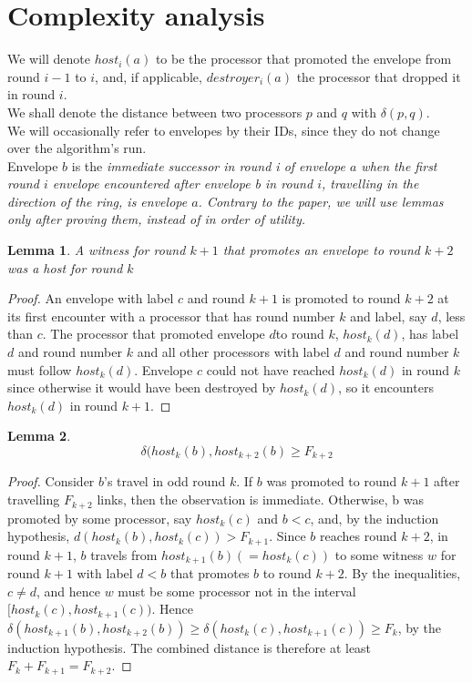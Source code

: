 \documentclass{article}
\newtheorem{lemma}{Lemma}
\begin{document}
\section{Complexity analysis}
We will denote $host_i(a)$ to be the processor that promoted the envelope from round $i-1$ to $i$, and, if applicable, $destroyer_i(a)$ the processor that dropped it in round $i$.
\\
We shall denote the distance between two processors $p$ and $q$ with $\delta(p, q)$.
\\
We will occasionally refer to envelopes by their IDs, since they do not change over the algorithm's run.
\\
Envelope $b$ is the \it{immediate successor in round i} of envelope $a$ when the first round $i$ envelope encountered after envelope b in round $i$, travelling in the direction of the ring, is envelope $a$.
Contrary to the paper, we will use lemmas only after proving them, instead of in order of utility.
\\
\begin{lemma}\label{p1}
    A witness for round $k+1$ that promotes an envelope to round $k+2$ was a host for round $k$
\end{lemma}
\begin{proof}
    An envelope with label $c$ and round $k+1$ is promoted to round $k+2$ at its first encounter
with a processor that has round number $k$ and label, say $d$, less than $c$. The processor that promoted
envelope $d $to round $k$, $host_k(d)$, has label $d$ and round number $k$ and all other processors with label
$d$ and round number $k$ must follow $host_k(d)$. Envelope $c$ could not have reached $host_k(d)$ in round $k$
since otherwise it would have been destroyed by $host_k(d)$, so it encounters $host_k(d)$ in round $k+1$. 
\end{proof}

\begin{lemma}\label{p2}
    \[\delta(host_k(b), host_{k+2}(b) \geq F_{k+2} \]
\end{lemma}
\begin{proof}
    Consider $b$’s travel in odd round $k$. If $b$ was promoted to round $k+1$ after travelling
$F_{k+2}$ links, then the observation is immediate. Otherwise, b was promoted by some processor, say
$host_k(c)$ and $b < c$, and, by the induction hypothesis, $d(host_k(b), host_k(c)) > F_{k+1}$. Since $b$ reaches
round $k + 2$, in round $k + 1$, $b$ travels from $host_{k+1}(b) (= host_k(c))$ to some witness $w$ for round $k + 1$ with label $d < b$ that promotes $b$ to round $k + 2$. By the inequalities, $c \neq d$, and hence $w$
must be some processor not in the interval $[host_k(c), host_{k+1}(c))$. Hence $\delta(host_{k+1}(b), host_{k+2}(b))
\geq \delta(host_k(c), host_{k+1}(c)) \geq F_k$, by the induction hypothesis. The combined distance is therefore at
least $F_k + F_{k+1} = F_{k+2}$. 
\end{proof}
\end{document}
